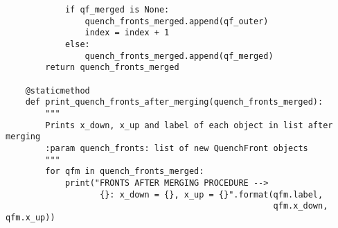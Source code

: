 \begin{verbatim}
            if qf_merged is None:
                quench_fronts_merged.append(qf_outer)
                index = index + 1
            else:
                quench_fronts_merged.append(qf_merged)
        return quench_fronts_merged

    @staticmethod
    def print_quench_fronts_after_merging(quench_fronts_merged):
        """
        Prints x_down, x_up and label of each object in list after merging
        :param quench_fronts: list of new QuenchFront objects
        """
        for qfm in quench_fronts_merged:
            print("FRONTS AFTER MERGING PROCEDURE --> 
                   {}: x_down = {}, x_up = {}".format(qfm.label, 
                                                      qfm.x_down, qfm.x_up))
\end{verbatim}